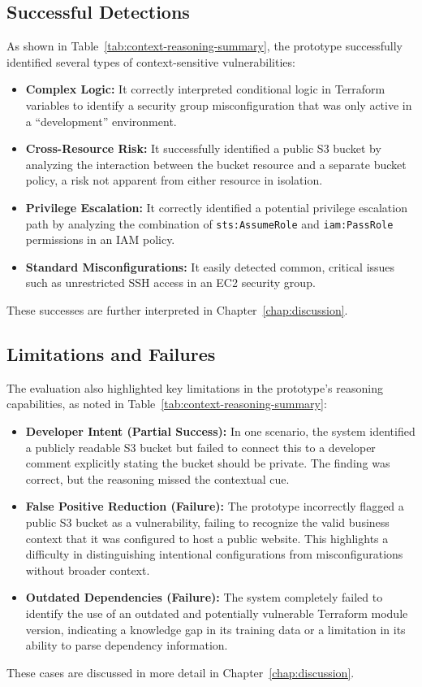 \subsection{Successful Detections}
As shown in Table~\ref{tab:context-reasoning-summary}, the prototype successfully identified several types of context-sensitive vulnerabilities:
\begin{itemize}
    \item \textbf{Complex Logic:} It correctly interpreted conditional logic in Terraform variables to identify a security group misconfiguration that was only active in a ``development'' environment.
    \item \textbf{Cross-Resource Risk:} It successfully identified a public S3 bucket by analyzing the interaction between the bucket resource and a separate bucket policy, a risk not apparent from either resource in isolation.
    \item \textbf{Privilege Escalation:} It correctly identified a potential privilege escalation path by analyzing the combination of \texttt{sts:AssumeRole} and \texttt{iam:PassRole} permissions in an IAM policy.
    \item \textbf{Standard Misconfigurations:} It easily detected common, critical issues such as unrestricted SSH access in an EC2 security group.
\end{itemize}
These successes are further interpreted in Chapter~\ref{chap:discussion}.

\subsection{Limitations and Failures}
The evaluation also highlighted key limitations in the prototype's reasoning capabilities, as noted in Table~\ref{tab:context-reasoning-summary}:
\begin{itemize}
    \item \textbf{Developer Intent (Partial Success):} In one scenario, the system identified a publicly readable S3 bucket but failed to connect this to a developer comment explicitly stating the bucket should be private. The finding was correct, but the reasoning missed the contextual cue.
    \item \textbf{False Positive Reduction (Failure):} The prototype incorrectly flagged a public S3 bucket as a vulnerability, failing to recognize the valid business context that it was configured to host a public website. This highlights a difficulty in distinguishing intentional configurations from misconfigurations without broader context.
    \item \textbf{Outdated Dependencies (Failure):} The system completely failed to identify the use of an outdated and potentially vulnerable Terraform module version, indicating a knowledge gap in its training data or a limitation in its ability to parse dependency information.
\end{itemize}
These cases are discussed in more detail in Chapter~\ref{chap:discussion}.

